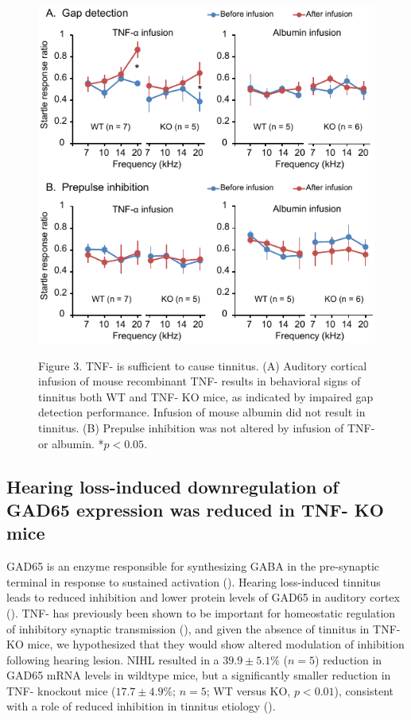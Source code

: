 \begin{figure}[h]
	\centering
		\includegraphics[width=4.5in]{images/C4F3}
	\begin{changemargin}{1in}{1in}
	\footnotesize{Figure 3. TNF-\textalpha{} is sufficient to cause tinnitus. (A) Auditory cortical infusion of mouse recombinant TNF-\textalpha{} results in behavioral signs of tinnitus both WT and TNF-\textalpha{} KO mice, as indicated by impaired gap detection performance. Infusion of mouse albumin did not result in tinnitus. (B) Prepulse inhibition was not altered by infusion of TNF-\textalpha{} or albumin. *$p<0.05$.}
	\end{changemargin}
\end{figure}

\subsection{Hearing loss-induced downregulation of GAD65 expression was reduced in TNF-\textalpha{} KO mice}

GAD65 is an enzyme responsible for synthesizing GABA in the pre-synaptic terminal in response to sustained activation (\cite{Tian1999, Iwai2003}). Hearing loss-induced tinnitus leads to reduced inhibition and lower protein levels of GAD65 in auditory cortex (\cite{Yang2011a}). TNF-\textalpha{} has previously been shown to be important for homeostatic regulation of inhibitory synaptic transmission (\cite{Pribiag2013}), and given the absence of tinnitus in TNF-\textalpha{} KO mice, we hypothesized that they would show altered modulation of inhibition following hearing lesion. NIHL resulted in a $39.9\pm5.1\%$ ($n = 5$) reduction in GAD65 mRNA levels in wildtype mice, but a significantly smaller reduction in TNF-\textalpha{} knockout mice ($17.7\pm4.9\%$; $n=5$; WT versus KO, $p<0.01$), consistent with a role of reduced inhibition in tinnitus etiology (\cite{Yang2011a}).

